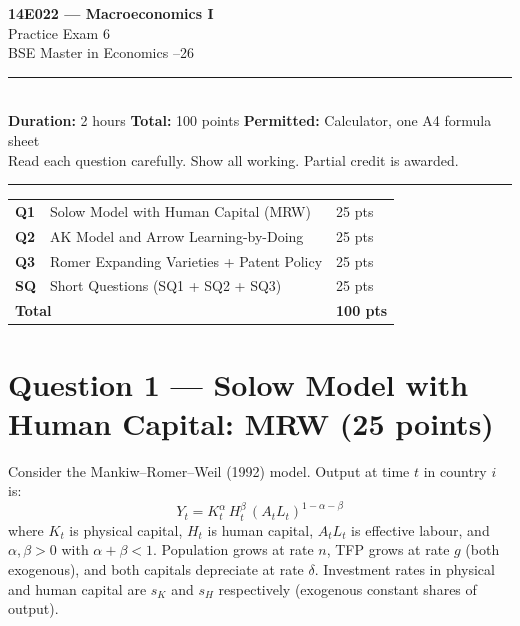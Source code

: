 \documentclass[a4paper,11pt]{article}
\begin{document}
\begin{center}
  {\LARGE\bfseries 14E022 --- Macroeconomics I}\\[6pt]
  {\Large Practice Exam 6}\\[4pt]
  {\large BSE Master in Economics --26}\\[10pt]
  \rule{\linewidth}{0.6pt}\\[6pt]
  {\normalsize \textbf{Duration:} 2 hours \quad
   \textbf{Total:} 100 points \quad
   \textbf{Permitted:} Calculator, one A4 formula sheet}\\[4pt]
  {\small Read each question carefully. Show all working. Partial credit is awarded.}\\[2pt]
  \rule{\linewidth}{0.4pt}
\end{center}

\vspace{4pt}
\begin{pointsbox}[title=Point Allocation]
  \begin{tabular}{lll}
    \textbf{Q1} & Solow Model with Human Capital (MRW) & 25 pts \\
    \textbf{Q2} & AK Model and Arrow Learning-by-Doing & 25 pts \\
    \textbf{Q3} & Romer Expanding Varieties + Patent Policy & 25 pts \\
    \textbf{SQ} & Short Questions (SQ1 + SQ2 + SQ3) & 25 pts \\
    \multicolumn{2}{l}{\textbf{Total}} & \textbf{100 pts}
  \end{tabular}
\end{pointsbox}

\clearpage

\section*{Question 1 --- Solow Model with Human Capital: MRW \hfill (25 points)}

Consider the Mankiw--Romer--Weil (1992) model. Output at time $t$ in country $i$ is:
\[
  Y_t = K_t^{\alpha}\, H_t^{\beta}\,(A_t L_t)^{1-\alpha-\beta}
\]
where $K_t$ is physical capital, $H_t$ is human capital, $A_t L_t$ is effective labour, and $\alpha,\beta>0$ with $\alpha+\beta<1$. Population grows at rate $n$, TFP grows at rate $g$ (both exogenous), and both capitals depreciate at rate $\delta$. Investment rates in physical and human capital are $s_K$ and $s_H$ respectively (exogenous constant shares of output).
\end{document}
